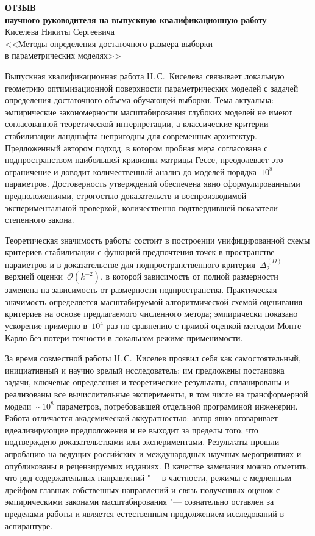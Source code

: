 \documentclass[11pt,a4paper]{extarticle}
\begin{document}
\pagestyle{empty}

\begin{center}
  \textbf{ОТЗЫВ}\\
  \textbf{научного руководителя на выпускную квалификационную работу}\\
  Киселева Никиты Сергеевича\\
  <<Методы определения достаточного размера выборки\\ в параметрических моделях>>
\end{center}

\vspace{0.3em}

Выпускная квалификационная работа Н.\,С.~Киселева связывает локальную геометрию оптимизационной поверхности параметрических моделей с задачей определения достаточного объема обучающей выборки. Тема актуальна: эмпирические закономерности масштабирования глубоких моделей не имеют согласованной теоретической интерпретации, а классические критерии стабилизации ландшафта непригодны для современных архитектур. Предложенный автором подход, в котором пробная мера согласована с подпространством наибольшей кривизны матрицы Гессе, преодолевает это ограничение и доводит количественный анализ до моделей порядка~${10^8}$ параметров. Достоверность утверждений обеспечена явно сформулированными предположениями, строгостью доказательств и воспроизводимой экспериментальной проверкой, количественно подтвердившей показатели степенного закона.

Теоретическая значимость работы состоит в построении унифицированной схемы критериев стабилизации с функцией предпочтения точек в пространстве параметров и в доказательстве для подпространственного критерия~${\Delta_2^{(D)}}$ верхней оценки~${\mathcal O(k^{-2})}$, в которой зависимость от полной размерности заменена на зависимость от размерности подпространства. Практическая значимость определяется масштабируемой алгоритмической схемой оценивания критериев на основе предлагаемого численного метода; эмпирически показано ускорение примерно в~${10^4}$ раз по сравнению с прямой оценкой методом Монте-Карло без потери точности в локальном режиме применимости.

За время совместной работы Н.\,С.~Киселев проявил себя как самостоятельный, инициативный и научно зрелый исследователь: им предложены постановка задачи, ключевые определения и теоретические результаты, спланированы и реализованы все вычислительные эксперименты, в том числе на трансформерной модели~${\sim 10^8}$ параметров, потребовавшей отдельной программной инженерии. Работа отличается академической аккуратностью: автор явно оговаривает идеализирующие предположения и не выходит за пределы того, что подтверждено доказательствами или экспериментами. Результаты прошли апробацию на ведущих российских и международных научных мероприятиях и опубликованы в рецензируемых изданиях. В качестве замечания можно отметить, что ряд содержательных направлений "--- в частности, режимы с медленным дрейфом главных собственных направлений и связь полученных оценок с эмпирическими законами масштабирования "--- сознательно оставлен за пределами работы и является естественным продолжением исследований в аспирантуре.
\end{document}
